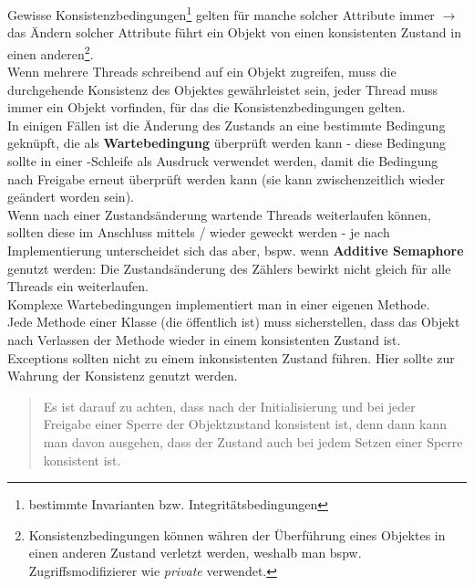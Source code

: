 \noindent
Gewisse Konsistenzbedingungen\footnote{bestimmte Invarianten bzw. Integritätsbedingungen} gelten für manche solcher Attribute immer $\rightarrow$ das Ändern solcher Attribute führt ein Objekt von einen konsistenten Zustand in einen anderen\footnote{
Konsistenzbedingungen können währen der Überführung eines Objektes in einen anderen Zustand verletzt werden, weshalb man bspw. Zugriffsmodifizierer wie \textit{private} verwendet.
}.\\

\noindent
Wenn mehrere Threads schreibend auf ein Objekt zugreifen, muss die durchgehende Konsistenz des Objektes gewährleistet sein, jeder Thread muss immer ein Objekt vorfinden, für das die Konsistenzbedingungen gelten.\\

\noindent
In einigen Fällen ist die Änderung des Zustands an eine bestimmte Bedingung geknüpft, die als \textbf{Wartebedingung} überprüft werden kann - diese Bedingung sollte in einer -Schleife als Ausdruck verwendet werden, damit die Bedingung nach Freigabe erneut überprüft werden kann (sie kann zwischenzeitlich wieder geändert worden sein).\\

\noindent
Wenn nach einer Zustandsänderung wartende Threads weiterlaufen können, sollten diese im Anschluss mittels / wieder geweckt werden - je nach Implementierung unterscheidet sich das aber, bspw. wenn \textbf{Additive Semaphore} genutzt werden: Die Zustandsänderung des Zählers bewirkt nicht gleich für alle Threads ein weiterlaufen.\\

\noindent
Komplexe Wartebedingungen implementiert man in einer eigenen Methode.\\

\noindent
Jede Methode einer Klasse (die öffentlich ist) muss sicherstellen, dass das Objekt nach Verlassen der Methode wieder in einem konsistenten Zustand ist.\\

\noindent
Exceptions sollten nicht zu einem inkonsistenten Zustand führen. Hier sollte  zur Wahrung der Konsistenz genutzt werden.

\blockquote[{\cite[142]{Oec22}}]{
Es ist darauf zu achten, dass nach der Initialisierung und bei jeder Freigabe einer Sperre der Objektzustand konsistent ist, denn dann kann man davon ausgehen, dass der Zustand auch bei jedem Setzen einer Sperre konsistent ist.
}


